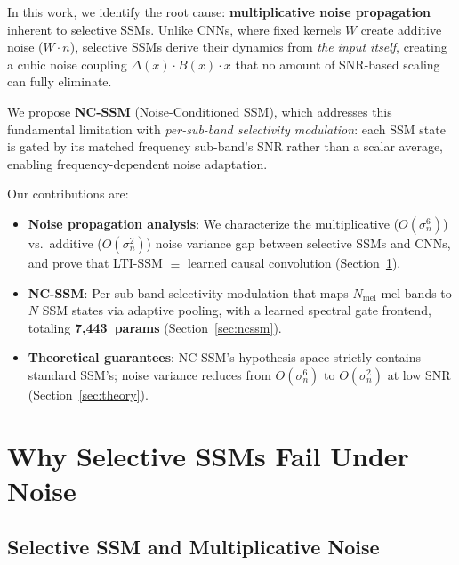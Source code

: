\documentclass{Interspeech}
\begin{document}
In this work, we identify the root cause: \textbf{multiplicative noise propagation} inherent to selective SSMs.
Unlike CNNs, where fixed kernels $W$ create additive noise ($W{\cdot}n$), selective SSMs derive their dynamics from \emph{the input itself}, creating a cubic noise coupling $\Delta(x){\cdot}B(x){\cdot}x$ that no amount of SNR-based scaling can fully eliminate.

We propose \textbf{NC-SSM} (Noise-Conditioned SSM), which addresses this fundamental limitation with \emph{per-sub-band selectivity modulation}: each SSM state is gated by its matched frequency sub-band's SNR rather than a scalar average, enabling frequency-dependent noise adaptation.

Our contributions are:
\begin{itemize}
\setlength\itemsep{0pt}
\item \textbf{Noise propagation analysis}: We characterize the multiplicative ($O(\sigma_n^6)$) vs.\ additive ($O(\sigma_n^2)$) noise variance gap between selective SSMs and CNNs, and prove that LTI-SSM $\equiv$ learned causal convolution (Section~\ref{sec:analysis}).
\item \textbf{NC-SSM}: Per-sub-band selectivity modulation that maps $N_{\text{mel}}$ mel bands to $N$ SSM states via adaptive pooling, with a learned spectral gate frontend, totaling \textbf{7,443~params} (Section~\ref{sec:ncssm}).
\item \textbf{Theoretical guarantees}: NC-SSM's hypothesis space strictly contains standard SSM's; noise variance reduces from $O(\sigma_n^6)$ to $O(\sigma_n^2)$ at low SNR (Section~\ref{sec:theory}).
\end{itemize}

\section{Why Selective SSMs Fail Under Noise}
\label{sec:analysis}

\subsection{Selective SSM and Multiplicative Noise}
\end{document}

